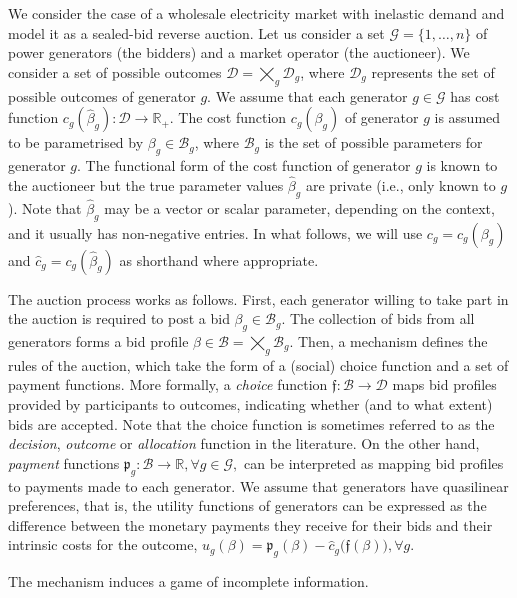 \documentclass{article}
\begin{document}
We consider the case of a wholesale electricity market with inelastic demand and model it as a sealed-bid reverse auction. Let us consider a set $\mathcal{G} = \{1, \ldots, n\}$ of power generators (the bidders) and a market operator (the auctioneer). We consider a set of possible outcomes $\mathcal{D} = \bigtimes_g \mathcal{D}_g$, where $\mathcal{D}_g$ represents the set of possible outcomes of generator $g$. We assume that each generator $g \in \mathcal{G}$ has cost function $c_g(\hat{\beta}_g): \mathcal{D} \rightarrow \mathbb{R}_+$. The cost function $c_g(\beta_g)$ of generator $g$ is assumed to be parametrised by $\beta_g \in \mathcal{B}_g$, where $\mathcal{B}_g$ is the set of possible parameters for generator $g$. The functional form of the cost function of generator $g$ is known to the auctioneer but the true parameter values $\hat{\beta}_g$ are private (i.e., only known to $g$). Note that $\hat{\beta}_g$ may be a vector or scalar parameter, depending on the context, and it usually has non-negative entries. In what follows, we will use $c_g = c_g(\beta_g)$ and $\hat{c}_g = c_g(\hat{\beta}_g)$ as shorthand where appropriate.

The auction process works as follows. First, each generator willing to take part in the auction is required to post a bid $\beta_g \in \mathcal{B}_g$. The collection of bids from all generators forms a bid profile $\beta \in \mathcal{B} = \bigtimes_g \mathcal{B}_g$. Then, a mechanism defines the rules of the auction, which take the form of a (social) choice function and a set of payment functions. More formally, a \textit{choice} function $\mathfrak{f}: \mathcal{B} \rightarrow \mathcal{D}$ maps bid profiles provided by participants to outcomes, indicating whether (and to what extent) bids are accepted. Note that the choice function is sometimes referred to as the \textit{decision}, \textit{outcome} or \textit{allocation} function in the literature. On the other hand, \textit{payment} functions $\mathfrak{p}_g: \mathcal{B} \rightarrow \mathbb{R}, \forall g \in \mathcal{G},$  can be interpreted as mapping bid profiles to payments made to each generator. We assume that generators have quasilinear preferences, that is, the utility functions of generators can be expressed as the difference between the monetary payments they receive for their bids and their intrinsic costs for the outcome, $u_g(\beta) = \mathfrak{p}_g(\beta) - \hat{c}_g\big(\mathfrak{f}(\beta)\big), \forall g$.

The mechanism induces a game of incomplete information.
\end{document}

